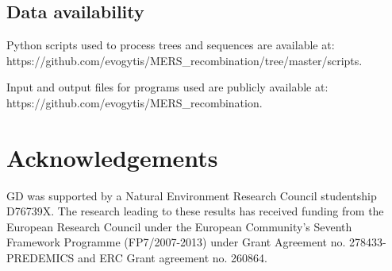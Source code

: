 \documentclass[11pt,oneside,letterpaper]{article}
\begin{document}
\subsection*{Data availability}
Python scripts used to process trees and sequences are available at:
\\https://github.com/evogytis/MERS\_recombination/tree/master/scripts.

Input and output files for programs used are publicly available at:
\\https://github.com/evogytis/MERS\_recombination.

\section*{Acknowledgements}
GD was supported by a Natural Environment Research Council studentship D76739X.
The research leading to these results has received funding from the European Research Council under the European Community's Seventh Framework Programme (FP7/2007-2013) under Grant Agreement no. 278433-PREDEMICS and ERC Grant agreement no. 260864.



\end{document}
